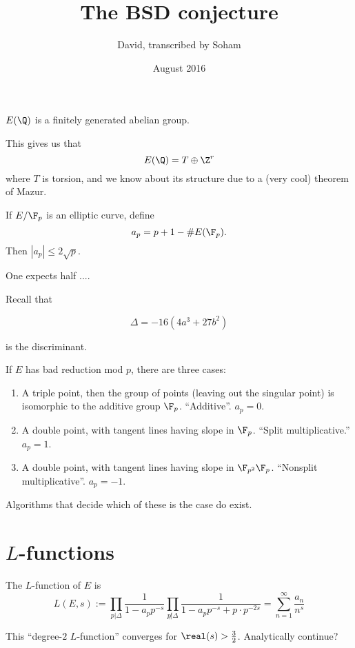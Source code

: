 \documentclass{article}
\title{The BSD conjecture}
\author{David, transcribed by Soham}
\date{August 2016}
\begin{document}
\maketitle

\begin{thm}
 $E(\Q)$ is a finitely generated abelian group. 
\end{thm}

This gives us that
$$E(\Q) = T\oplus \Z^r$$
where $T$ is torsion, and we know about its structure due to a (very cool) theorem of Mazur.

\begin{thm}[Hasse]
  If $E/\F_p$ is an elliptic curve, define
  $$a_p = p+1-\#E(\F_p).$$
  Then $|a_p|\leq 2\sqrt p$.
\end{thm}

One expects half ....

Recall that

$$\Delta = -16(4a^3+27b^2)$$

is the discriminant.

If $E$ has bad reduction mod $p$, there are three cases:
\begin{enumerate}
\item A triple point, then the group of points (leaving out the singular point)
  is isomorphic to the additive group $\F_p$. ``Additive''. $a_p = 0$.
\item A double point, with tangent lines having slope in $\F_p$. ``Split
  multiplicative.'' $a_p = 1$.
\item A double point, with tangent lines having slope in $\F_{p^2}\\\F_p$.
  ``Nonsplit multiplicative''. $a_p = -1$.
\end{enumerate}

Algorithms that decide which of these is the case do exist.

\section{$L$-functions}
\begin{defn}
  The $L$-function of $E$ is
  $$L(E,s) := \prod_{p|\Delta} \frac1{1-a_pp^{-s}}
              \prod_{p\not|\Delta} \frac1{1-a_pp^{-s}+p\cdot p^{-2s}} =
              \sum_{n=1}^\infty \frac{a_n}{n^s}$$
\end{defn}

This ``degree-$2$ $L$-function'' converges for $\real(s)>\frac32$. Analytically
continue?
\end{document}

